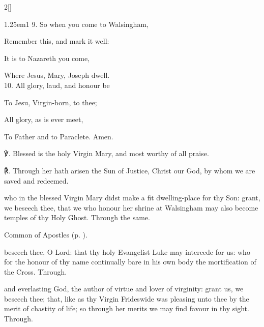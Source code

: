 \begin{paracol}{2}[]
\begin{hangparas}{1.25em}{1}
9. So when you come to Walsingham,\par
Remember this, and mark it well:\par
It is to Nazareth you come,\par
Where Jesus, Mary, Joseph dwell.\\

10. All glory, laud, and honour be\par
To Jesu, Virgin-born, to thee;\par
All glory, as is ever meet,\par
To Father and to Paraclete. Amen.\\
\end{hangparas}

℣. Blessed is the holy Virgin Mary, and most worthy of all praise.

℟. Through her hath arisen the Sun of Justice, Christ our God, by whom we are saved and redeemed.

\end{paracol}


\clearpage
\collect
{} who in the blessed Virgin Mary didst make a fit dwelling-place for thy Son: grant, we beseech thee, that we who honour her shrine at Walsingham may also become temples of thy Holy Ghost. Through the same.



\begin{rubric}
	Common of Apostles (p. \pageref{CommonApostles}).
\end{rubric}

{} beseech thee, O Lord: that thy holy Evangelist Luke may intercede for us: who for the honour of thy name continually bare in his own body the mortification of the Cross. Through.



\memorialCollect
{} and everlasting God, the author of virtue and lover of virginity: grant us, we beseech thee; that, like as thy Virgin Frideswide was pleasing unto thee by the merit of chastity of life; so through her merits we may find favour in thy sight. Through.



